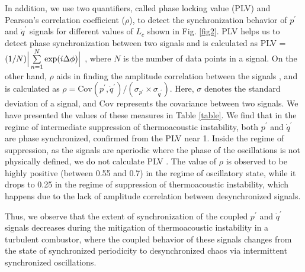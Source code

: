 \documentclass[%
preprint,
 amsmath,amssymb,
 aps,
 pra,
]{revtex4-2}
\begin{document}
In addition, we use two quantifiers, called phase locking value (PLV) and Pearson's correlation coefficient ($\rho$), to detect the synchronization behavior of $p^{\prime}$ and $\dot{q}^{\prime}$ signals for different values of $L_c$ shown in Fig. \ref{fig2}. PLV helps us to detect phase synchronization between two signals and is calculated as PLV = $(1/N) \Big{\lvert} \sum\limits_{n=1}^N \text{exp}(i \Delta \phi) \Big{\lvert}$ \cite{pikovsky2001universal}, where $N$ is the number of data points in a signal. On the other hand, $\rho$ aids in finding the amplitude correlation between the signals \cite{gonzalez2002amplitude}, and is calculated as $\rho = \text{Cov}(p^{\prime},\dot{q}^{\prime})/(\sigma_{p^{\prime}} \times \sigma_{\dot{q}^{\prime}})$. Here, $\sigma$ denotes the standard deviation of a signal, and $\text{Cov}$ represents the covariance between two signals. We have presented the values of these measures in Table \ref{table}. We find that in the regime of intermediate suppression of thermoacoustic instability, both $p^{\prime}$ and $\dot{q}^{\prime}$ are phase synchronized, confirmed from the PLV near 1. Inside the regime of suppression, as the signals are aperiodic where the phase of the oscillations is not physically defined, we do not calculate PLV \cite{pikovsky2001universal,sujith2021thermoacoustic}. The value of $\rho$ is observed to be highly positive (between 0.55 and 0.7) in the regime of oscillatory state, while it drops to 0.25 in the regime of suppression of thermoacoustic instability, which happens due to the lack of amplitude correlation between desynchronized signals.   

Thus, we observe that the extent of synchronization of the coupled $p^{\prime}$ and $\dot{q}^{\prime}$ signals decreases during the mitigation of thermoacoustic instability in a turbulent combustor, where the coupled behavior of these signals changes from the state of synchronized periodicity to desynchronized chaos via intermittent synchronized oscillations.
\end{document}
